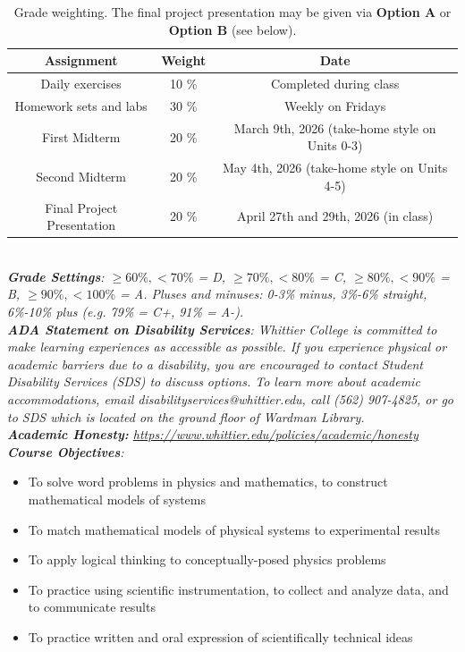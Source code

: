 \documentclass[10pt]{article}
\begin{document}
\begin{table}
\centering
\begin{tabular}{| c | c | c |}
\hline
\textbf{Assignment} & \textbf{Weight} & \textbf{Date} \\ \hline
Daily exercises & 10 \% & Completed during class\\ \hline
Homework sets and labs & 30 \% & Weekly on Fridays \\ \hline
First Midterm & 20 \% & March 9th, 2026 (take-home style on Units 0-3)\\ \hline
Second Midterm & 20 \% & May 4th, 2026 (take-home style on Units 4-5) \\ \hline
Final Project Presentation & 20 \% & April 27th and 29th, 2026 (in class) \\ \hline
\end{tabular}
\caption{\label{tab:grades} Grade weighting. The final project presentation may be given via \textbf{Option A} or \textbf{Option B} (see below).}
\end{table} \\
\noindent
\textit{\textbf{Grade Settings}: $\geq 60\%, <70\%$ = D, $\geq 70\%, <80\%$ = C, $\geq 80\%, <90\%$ = B, $\geq 90\%, <100\%$ = A. Pluses and minuses: 0-3\% minus, 3\%-6\% straight, 6\%-10\% plus (e.g. 79\% = C+, 91\% = A-).} \\
\textit{\textbf{ADA Statement on Disability Services}: Whittier College is committed to make learning experiences as accessible as possible. If you experience physical or academic barriers due to a disability, you are encouraged to contact Student Disability Services (SDS) to discuss options. To learn more about academic accommodations, email disabilityservices@whittier.edu, call (562) 907-4825, or go to SDS which is located on the ground floor of Wardman Library.} \\
\textit{\textbf{Academic Honesty:} \url{https://www.whittier.edu/policies/academic/honesty}} \\
\noindent
\textit{\textbf{Course Objectives}:}
\begin{itemize}
\item To solve word problems in physics and mathematics, to construct mathematical models of systems
\item To match mathematical models of physical systems to experimental results
\item To apply logical thinking to conceptually-posed physics problems
\item To practice using scientific instrumentation, to collect and analyze data, and to communicate results
\item To practice written and oral expression of scientifically technical ideas
\end{itemize}
\end{document}
